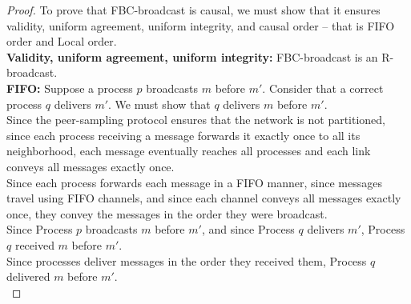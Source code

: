 \begin{proof}
  To prove that FBC-broadcast is causal, we must show that it ensures validity,
  uniform agreement, uniform integrity, and causal order -- that is FIFO order
  and Local order. \\
  \textbf{Validity, uniform agreement, uniform integrity:} FBC-broadcast is an
  R-broadcast. \\
  \textbf{FIFO:} Suppose a process $p$ broadcasts $m$ before $m'$. Consider that
  a correct process $q$ delivers $m'$. We must show that $q$ delivers $m$ before
  $m'$. \\
  Since the peer-sampling protocol ensures that the network is not partitioned,
  since each process receiving a message forwards it exactly once to all its
  neighborhood, each message eventually reaches all processes and each link
  conveys all messages exactly once. \\
  Since each process forwards each message in a FIFO manner, since messages
  travel using FIFO channels, and since each channel conveys all messages
  exactly once, they convey the messages in the order they were broadcast. \\
  Since Process $p$ broadcasts $m$ before $m'$, and since Process $q$ delivers
  $m'$, Process $q$ received $m$ before $m'$. \\
  Since processes deliver messages in the order they received them, Process $q$
  delivered $m$ before $m'$. \\

\end{proof}
